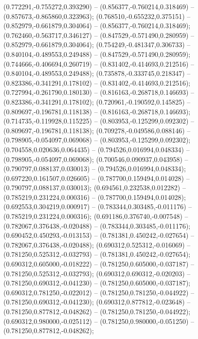  (0.772291,-0.755272,0.393290) -- (0.856377,-0.760214,0.318469) -- (0.857673,-0.865860,0.323963);
 (0.768510,-0.655232,0.375151) -- (0.852979,-0.661879,0.304064) -- (0.856377,-0.760214,0.318469);
 (0.762460,-0.563717,0.346127) -- (0.847529,-0.571490,0.280959) -- (0.852979,-0.661879,0.304064);
 (0.754249,-0.481347,0.306733) -- (0.840104,-0.489553,0.249488) -- (0.847529,-0.571490,0.280959);
 (0.744666,-0.406694,0.260719) -- (0.831402,-0.414693,0.212516) -- (0.840104,-0.489553,0.249488);
 (0.735878,-0.333745,0.218347) -- (0.823386,-0.341291,0.178102) -- (0.831402,-0.414693,0.212516);
 (0.727994,-0.261790,0.180130) -- (0.816163,-0.268718,0.146693) -- (0.823386,-0.341291,0.178102);
 (0.720961,-0.190592,0.145825) -- (0.809697,-0.196781,0.118138) -- (0.816163,-0.268718,0.146693);
 (0.714735,-0.119928,0.115225) -- (0.803953,-0.125299,0.092302) -- (0.809697,-0.196781,0.118138);
 (0.709278,-0.049586,0.088146) -- (0.798905,-0.054097,0.069068) -- (0.803953,-0.125299,0.092302);
 (0.704558,0.020636,0.064435) -- (0.794526,0.016994,0.048334) -- (0.798905,-0.054097,0.069068);
 (0.700546,0.090937,0.043958) -- (0.790797,0.088137,0.030013) -- (0.794526,0.016994,0.048334);
 (0.697220,0.161507,0.026605) -- (0.787700,0.159494,0.014028) -- (0.790797,0.088137,0.030013);
 (0.694561,0.232538,0.012282) -- (0.785219,0.231224,0.000316) -- (0.787700,0.159494,0.014028);
 (0.692553,0.304219,0.000917) -- (0.783344,0.303485,-0.011176) -- (0.785219,0.231224,0.000316);
 (0.691186,0.376740,-0.007548) -- (0.782067,0.376438,-0.020488) -- (0.783344,0.303485,-0.011176);
 (0.690452,0.450293,-0.013153) -- (0.781381,0.450242,-0.027654) -- (0.782067,0.376438,-0.020488);
 (0.690312,0.525312,-0.016069) -- (0.781250,0.525312,-0.032793) -- (0.781381,0.450242,-0.027654);
 (0.690312,0.605000,-0.018222) -- (0.781250,0.605000,-0.037187) -- (0.781250,0.525312,-0.032793);
 (0.690312,0.690312,-0.020203) -- (0.781250,0.690312,-0.041230) -- (0.781250,0.605000,-0.037187);
 (0.690312,0.781250,-0.022012) -- (0.781250,0.781250,-0.044922) -- (0.781250,0.690312,-0.041230);
 (0.690312,0.877812,-0.023648) -- (0.781250,0.877812,-0.048262) -- (0.781250,0.781250,-0.044922);
 (0.690312,0.980000,-0.025112) -- (0.781250,0.980000,-0.051250) -- (0.781250,0.877812,-0.048262);
